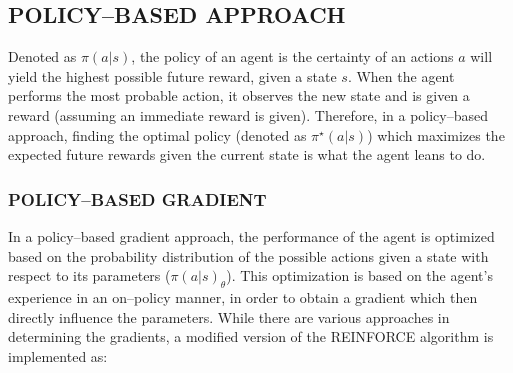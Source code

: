 \documentclass{article}
\let\oldcite\cite
\renewcommand{\cite}[1]{\textbf{\oldcite{#1}}}
\renewenvironment{leftbar}[1][\hsize]{
    \def\FrameCommand{{\color{barcolor}\vrule width 0.5pt \hspace{10pt}}}
    \MakeFramed{\hsize#1 \advance\hsize-\width \FrameRestore}
}{\endMakeFramed}
\begin{document}
\subsection*{\normalsize POLICY–BASED APPROACH}
\begin{leftbar}
    Denoted as $\pi(a|s)$, the policy of an agent is the certainty of an actions $a$ will yield the highest possible future reward, given a state $s$. When the agent performs the most probable action, it observes the new state and is given a reward (assuming an immediate reward is given). Therefore, in a policy–based approach, finding the optimal policy (denoted as $\pi^\star (a|s)$) which maximizes the expected future rewards given the current state is what the agent leans to do. \cite{HF-approaches}

    \hypertarget{sec:policy-based-approach}{}
    \subsubsection*{POLICY–BASED GRADIENT}

    In a policy–based gradient approach, the performance of the agent is optimized based on the probability distribution of the possible actions given a state with respect to its parameters ($\pi(a|s)_\theta$). This optimization is based on the agent's experience in an on–policy manner, in order to obtain a gradient which then directly influence the parameters. \cite{HF-policy} While there are various approaches in determining the gradients, a modified version of the REINFORCE algorithm is implemented as:


\end{leftbar}
\end{document}
